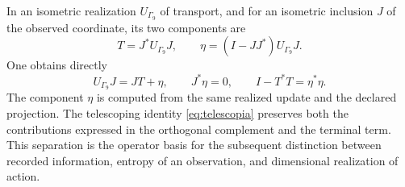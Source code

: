 In an isometric realization \(U_{\Gamma_9}\) of transport, and for
an isometric inclusion \(J\) of the observed coordinate, its two
components are
\[
 T=J^*U_{\Gamma_9}J,\qquad
 \eta=(I-JJ^*)U_{\Gamma_9}J.
\]
One obtains directly
\[
 U_{\Gamma_9}J=JT+\eta,\qquad J^*\eta=0,\qquad
 I-T^*T=\eta^*\eta.
\]
The component \(\eta\) is computed from the same realized update
and the declared projection. The telescoping identity
\eqref{eq:telescopia} preserves both the contributions expressed in the
orthogonal complement and the terminal term. This separation is the
operator basis for the subsequent distinction between recorded information,
entropy of an observation, and dimensional realization of action.
